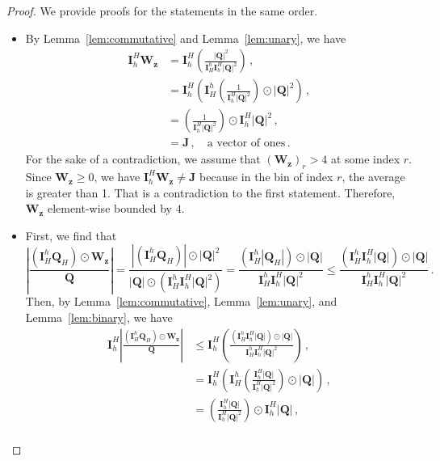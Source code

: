 \documentclass{article}
\numberwithin{equation}{section}
\begin{document}
\begin{proof} We provide proofs for the statements in the same order. 
\begin{itemize}
    \item By Lemma~\ref{lem:commutative} and Lemma~\ref{lem:unary}, we have
    \begin{equation*}
        \begin{aligned}
            \bm{I}_h^H{\bm{W}_{\bm{z}}} &= \bm{I}_h^H\left( \frac{|\bm{Q}|^2}{\bm{I}_H^h\bm{I}_h^H|\bm{Q}|^2}\right)\,,\\
            &= \bm{I}_h^H\left( \bm{I}_H^h\left(\frac{1}{\bm{I}_h^H|\bm{Q}|^2}\right)\odot|\bm{Q}|^2\right)\,,\\
            &= \left(\frac{1}{\bm{I}_h^H|\bm{Q}|^2}\right)\odot\bm{I}_h^H|\bm{Q}|^2\,,\\
            &= \bm{J}\,,\quad\text{a vector of ones}\,.
        \end{aligned}
    \end{equation*}
    For the sake of a contradiction, we assume that $(\bm{W}_{\bm{z}})_r > 4$ at some index $r$. Since $\bm{W}_{\bm{z}}\geq 0$, we have $\bm{I}_h^H{\bm{W}_{\bm{z}}}\neq \bm{J}$ because in the bin of index $r$, the average is greater than 1. That is a contradiction to the first statement. Therefore, $\bm{W}_{\bm{z}}$ element-wise bounded by $4$.
    \item First, we find that
    \begin{equation*}
        \left|\frac{(\bm{I}_H^h\bm{Q}_H)\odot\bm{W}_{\bm{z}}}{\bm{Q}}\right| =  \frac{|(\bm{I}_H^h\bm{Q}_H)|\odot|\bm{Q}|^2}{|\bm{Q}|\odot\left(\bm{I}_H^h\bm{I}_h^H|\bm{Q}|^2\right)} = \frac{\left(\bm{I}_H^h|\bm{Q}_H|\right)\odot|\bm{Q}|}{\bm{I}_H^h\bm{I}_h^H|\bm{Q}|^2}\leq \frac{\left(\bm{I}_H^h\bm{I}_h^H|\bm{Q}|\right)\odot|\bm{Q}|}{\bm{I}_H^h\bm{I}_h^H|\bm{Q}|^2} \,.
    \end{equation*}
    Then, by Lemma~\ref{lem:commutative}, Lemma~\ref{lem:unary}, and Lemma~\ref{lem:binary}, we have
    \begin{equation*}
        \begin{aligned}
            \bm{I}_h^H\left|\frac{(\bm{I}_H^h\bm{Q}_H)\odot\bm{W}_{\bm{z}}}{\bm{Q}}\right|&\leq\bm{I}_h^H\left(\frac{\left(\bm{I}_H^h\bm{I}_h^H|\bm{Q}|\right)\odot|\bm{Q}|}{\bm{I}_H^h\bm{I}_h^H|\bm{Q}|^2}\right)\,,\\&=\bm{I}_h^H\left(\bm{I}_H^h\left(\frac{\bm{I}_h^H|\bm{Q}|}{\bm{I}_h^H|\bm{Q}|^2}\right)\odot|\bm{Q}|\right)\,,\\
            &=\left(\frac{\bm{I}_h^H|\bm{Q}|}{\bm{I}_h^H|\bm{Q}|^2}\right)\odot\bm{I}_h^H|\bm{Q}|\,,\\

\end{aligned}
\end{equation*}
\end{itemize}
\end{proof}
\end{document}
